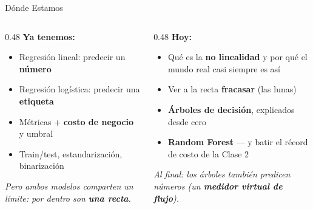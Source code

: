 \documentclass[aspectratio=169, 11pt]{beamer}
\begin{document}
\begin{frame}[shrink=8]{Dónde Estamos}
  \vspace{-4pt}
  \begin{columns}[T]
    \begin{column}{0.48\textwidth}
      {\small\color{arcaDark}\bfseries\faCheckCircle\hspace{5pt}Ya tenemos:}
      \vspace{4pt}
      {\footnotesize\color{textMuted}
      \begin{itemize}\setlength{\itemsep}{3pt}
        \item[{\color{codeGreen}\scriptsize\faCheck}]
          Regresión lineal: predecir un \textbf{número}
        \item[{\color{codeGreen}\scriptsize\faCheck}]
          Regresión logística: predecir una \textbf{etiqueta}
        \item[{\color{codeGreen}\scriptsize\faCheck}]
          Métricas + \textbf{costo de negocio} y umbral
        \item[{\color{codeGreen}\scriptsize\faCheck}]
          Train/test, estandarización, binarización
      \end{itemize}
      }
      \vspace{6pt}
      {\scriptsize\color{textMuted}\itshape
        Pero ambos modelos comparten un límite:
        por dentro son \textbf{una recta}.}
    \end{column}
    \begin{column}{0.48\textwidth}
      {\small\color{arcaDark}\bfseries\faForward\hspace{5pt}Hoy:}
      \vspace{4pt}
      {\footnotesize\color{textMuted}
      \begin{itemize}\setlength{\itemsep}{3pt}
        \item[{\color{arcaRed}\scriptsize\faArrowRight}]
          Qué es la \textbf{no linealidad} y por qué el mundo
          real casi siempre es así
        \item[{\color{arcaRed}\scriptsize\faArrowRight}]
          Ver a la recta \textbf{fracasar} (las lunas)
        \item[{\color{arcaRed}\scriptsize\faArrowRight}]
          \textbf{Árboles de decisión}, explicados desde cero
        \item[{\color{arcaRed}\scriptsize\faStar}]
          \textbf{Random Forest} --- y batir el récord de costo
          de la Clase 2
      \end{itemize}
      }
      \vspace{4pt}
      {\scriptsize\color{arcaDark}\itshape
        Al final: los árboles también predicen números
        (un \textbf{medidor virtual de flujo}).}
    \end{column}
  \end{columns}
\end{frame}
\end{document}
